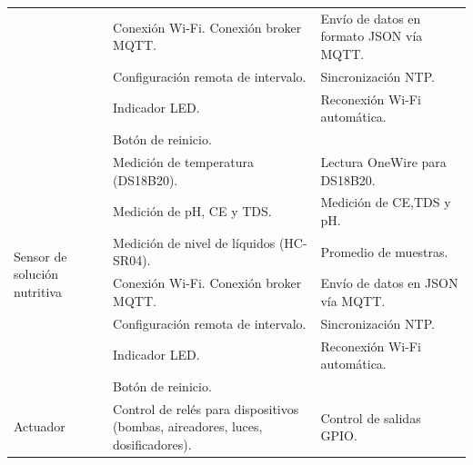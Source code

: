 \begin{table}[H]
\begin{tabular}{p{1.5cm}p{5.4cm}p{5.5cm}}
                                                          & Conexión Wi-Fi.                     Conexión broker MQTT.                      & Envío de datos en formato JSON vía MQTT.        \\
                                                          & Configuración remota de intervalo.                                             & Sincronización NTP.                             \\
                                                          & Indicador LED.                                                                 & Reconexión Wi-Fi automática.                    \\
                                                          & Botón de reinicio.                                                             &                                                 \\
        \midrule
        \multirow{7}{1.5cm}{Sensor de solución nutritiva} & Medición de temperatura (DS18B20).                                             & Lectura OneWire para DS18B20.                   \\
                                                          & Medición de pH, CE y TDS.                                                      & Medición de CE,TDS y pH.                        \\
                                                          & Medición de nivel de líquidos (HC-SR04).                                       & Promedio de muestras.                           \\
                                                          & Conexión Wi-Fi.                     Conexión broker MQTT.                      & Envío de datos en JSON vía MQTT.                \\
                                                          & Configuración remota de intervalo.                                             & Sincronización NTP.                             \\
                                                          & Indicador LED.                                                                 & Reconexión Wi-Fi automática.                    \\
                                                          & Botón de reinicio.                                                             &                                                 \\
        \midrule
        \multirow{7}{1.5cm}{Actuador}                     & Control de relés para dispositivos (bombas, aireadores, luces, dosificadores). & Control de salidas GPIO.                        \\

\end{tabular}
\end{table}

